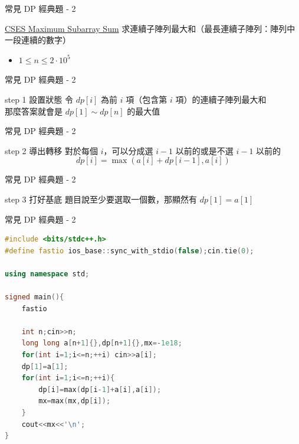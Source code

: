 \documentclass[aspectratio=169]{beamer}
\begin{document}
    \begin{frame}{常見 DP 經典題 - 2}
        \begin{block}{\href{https://cses.fi/problemset/task/1643/}{CSES Maximum Subarray Sum}}
            求連續子陣列最大和（最長連續子陣列：陣列中一段連續的數字）\\
            \vspace{2.5mm}
            \begin{itemize}
                \item $1 \leq n \leq 2 \cdot 10^5$
            \end{itemize}
        \end{block}
    \end{frame}
    
    \begin{frame}{常見 DP 經典題 - 2}
        \begin{alertblock}{step 1 設置狀態}
            令 $dp[i]$ 為前 $i$ 項（包含第 $i$ 項）的連續子陣列最大和 \\
            \vspace{2mm}
            那麼答案就會是 $dp[1] \sim dp[n]$ 的最大值
        \end{alertblock}
    \end{frame}
    \begin{frame}{常見 DP 經典題 - 2}
        \begin{block}{step 2 導出轉移}
            對於每個 $i$，可以分成選 $i-1$ 以前的或是不選 $i-1$ 以前的 \\
            $$dp[i] = \max( a[i] + dp[i-1], a[i] )$$
        \end{block}
    \end{frame}
    \begin{frame}{常見 DP 經典題 - 2}
        \begin{block}{step 3 打好基底}
            題目說至少要選取一個數，那顯然有 $dp[1] = a[1]$
        \end{block}
    \end{frame}

    \begin{frame}[fragile]{常見 DP 經典題 - 2}
        \begin{lstlisting}[language=C++, basicstyle=\ttfamily\tiny]
#include <bits/stdc++.h>
#define fastio ios_base::sync_with_stdio(false);cin.tie(0);

using namespace std;

signed main(){
    fastio
 
    int n;cin>>n;
    long long a[n+1]{},dp[n+1]{},mx=-1e18;
    for(int i=1;i<=n;++i) cin>>a[i];
    dp[1]=a[1];
    for(int i=1;i<=n;++i){
        dp[i]=max(dp[i-1]+a[i],a[i]);
        mx=max(mx,dp[i]);
    }
    cout<<mx<<'\n';
}
        \end{lstlisting}
    \end{frame}
\end{document}
